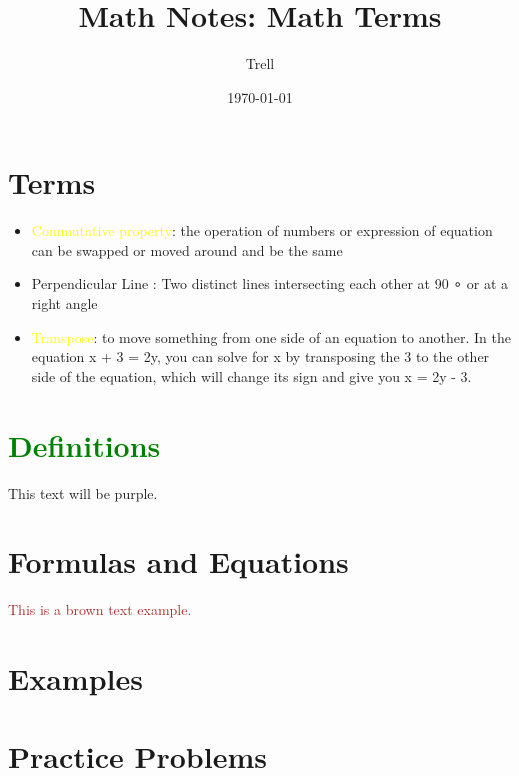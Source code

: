 \documentclass{article}
\title{Math Notes: Math Terms}
\author{Trell}
\date{\today}
\begin{document}

\maketitle

\section{Terms}
\begin{itemize}
    \item \textcolor{Yellow}{Commutative property}: the operation of numbers or expression of equation can be swapped or moved around and be the same
    \item Perpendicular Line : Two distinct lines intersecting each other at 90 ∘ or at a right angle
    \item \textcolor{Yellow}{Transpose}: to move something from one side of an equation to another. In the equation x + 3 = 2y, you can solve for x by transposing the 3 to the other side of the equation, which will change its sign and give you x = 2y - 3.
\end{itemize}

\section{\textcolor{Green}{Definitions}}
{\color{Purple}This text will be purple.}

\section{Formulas and Equations}
\textcolor{Brown}{This is a brown text example.}

\section{Examples}

\section{Practice Problems}
\end{document}
